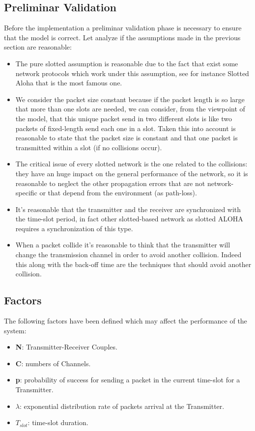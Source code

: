 \subsection{Preliminar Validation}
Before the implementation a preliminar validation phase is necessary to ensure that the model is correct. Let analyze if the assumptions made in the previous section are reasonable:
\begin{itemize}
	\item The pure slotted assumption is reasonable due to the fact that exist some network protocols which work under this assumption, see for instance Slotted Aloha that is the most famous one.
	\item We consider the packet size constant because if the packet length is so large that more than one slots are needed, we can consider, from the viewpoint of the model, that this unique packet send in two different slots is like two packets of fixed-length send each one in a slot. Taken this into account is reasonable to state that the packet size is constant and that one packet is transmitted within a slot (if no collisions occur).
	
	
	\item The critical issue of every slotted network is the one related to the collisions: they have an huge impact on the general performance of the network, so it is reasonable to neglect the other propagation errors that are not network-specific or that depend from the environment (as path-loss).
	\item It's reasonable that the transmitter and the receiver are synchronized with the time-slot period, in fact other slotted-based network as slotted ALOHA requires a synchronization of this type.
	\item When a packet collide it's reasonable to think that the transmitter will change the transmission channel in order to avoid another collision. Indeed this along with the back-off time are the techniques that should avoid another collision. 
\end{itemize}
\subsection{Factors}
The following factors have been defined which may affect the performance of the system:
\begin{itemize}
	\item \textbf{N}: Transmitter-Receiver Couples.
	\item \textbf{C}: numbers of Channels.
	\item \textbf{p}: probability of success for sending a packet in the current time-slot for a Transmitter.
	\item \textbf{$\lambda$}: exponential distribution rate of packets arrival at the Transmitter.
	\item $T_{slot}$: time-slot duration.
	
\end{itemize}